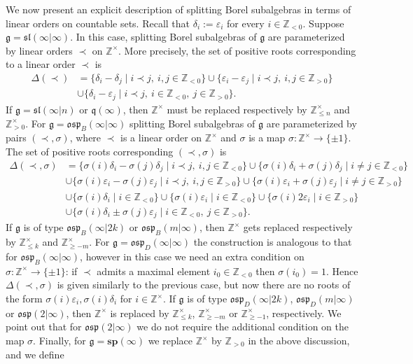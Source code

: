 \documentclass[12pt]{amsart}
\newcommand\Z{\mathbb{Z}}
\newcommand\g{\mathfrak{g}}
\newcommand\fq{\mathfrak{q}}
\newcommand\fsl{\mathfrak{sl}}
\newcommand\fosp{\mathfrak{osp}}
\newcommand\D{\Delta}
\newcommand\bsp{\mathbf{sp}}
\theoremstyle{plain}
\theoremstyle{definition}
\numberwithin{equation}{section}
\begin{document}
We now present an explicit description of splitting Borel subalgebras in terms of linear orders on countable sets. Recall that $\delta_i:=\varepsilon_i$ for every $i\in \Z_{<0}$. Suppose $\g=\fsl(\infty|\infty)$. In this case, splitting Borel subalgebras of $\g$ are parameterized by linear orders $\prec$ on $\Z^\times $. More precisely, the set of positive roots corresponding to a linear order $\prec$ is 
\begin{align*}
\D(\prec) & = \{\delta_i - \delta_j\mid i\prec j,\ i,j\in \Z_{<0}\}\cup \{\varepsilon_i - \varepsilon_j\mid i\prec j,\ i,j\in \Z_{>0}\} \\
& \cup \{\delta_i - \varepsilon_j\mid i\prec j,\ i\in \Z_{<0},\ j\in \Z_{>0}\}.
\end{align*}
If $\g=\fsl(\infty|n)$ or $\fq(\infty)$, then $\Z^\times$ must be replaced respectively by $\Z_{\leq n}^\times$ and $\Z_{>0}^\times$. For $\g = \fosp_B(\infty|\infty)$ splitting Borel subalgebras of $\g$ are parameterized by pairs $(\prec, \sigma)$, where $\prec$ is a linear order on $\Z^\times $ and $\sigma$ is a map $\sigma : \Z^\times \to \{\pm 1\}$. The set of positive roots corresponding $(\prec, \sigma)$ is
\begin{align*}
\D(\prec, \sigma) & = \{\sigma(i)\delta_i - \sigma(j)\delta_j\mid i\prec j,\ i,j\in \Z_{<0}\}\cup \{\sigma(i)\delta_i + \sigma(j)\delta_j\mid i\neq j\in \Z_{<0}\} \\
& \cup \{\sigma(i)\varepsilon_i - \sigma(j)\varepsilon_j\mid i\prec j,\ i,j\in \Z_{>0}\}\cup \{\sigma(i)\varepsilon_i + \sigma(j)\varepsilon_j\mid i\neq j\in \Z_{>0}\} \\
& \cup  \{\sigma(i)\delta_i \mid i\in \Z_{<0}\} \cup  \{\sigma(i)\varepsilon_i \mid i\in \Z_{<0}\} 
\cup  \{\sigma(i)2\varepsilon_i \mid i\in \Z_{>0}\} \\
& \cup \{\sigma(i)\delta_i \pm  \sigma(j)\varepsilon_j\mid i\in \Z_{<0},\ j\in \Z_{>0}\}.
\end{align*}
If $\g$ is of type $\fosp_B(\infty|2k)$ or $\fosp_B(m|\infty)$, then $\Z^\times $ gets replaced respectively by $\Z_{\leq k}^\times$ and $\Z_{\geq -m}^\times$. For $\g=\fosp_D(\infty|\infty)$ the construction is analogous to that for $\fosp_B(\infty|\infty)$, however in this case we need an extra condition on $\sigma : \Z^\times \to \{\pm 1\}$: if $\prec$ admits a maximal element $i_0\in \Z_{<0}$ then $\sigma(i_0)=1$. Hence $\D(\prec, \sigma)$ is given similarly to the previous case, but now there are no roots of the form $\sigma(i)\varepsilon_i, \sigma(i)\delta_i$ for $i\in \Z^\times$. If $\g$ is of type $\fosp_D(\infty|2k)$, $\fosp_D(m|\infty)$ or $\fosp(2|\infty)$, then $\Z^\times $ is replaced by $\Z_{\leq k}^\times$, $\Z_{\geq -m}^\times$ or $\Z_{\geq -1}^\times$, respectively. We point out that for $\fosp(2|\infty)$ we do not require the additional condition on the map $\sigma$. Finally, for $\g=\bsp(\infty)$ we replace $\Z^\times $ by $\Z_{>0}$ in the above discussion, and we define
\end{document}
